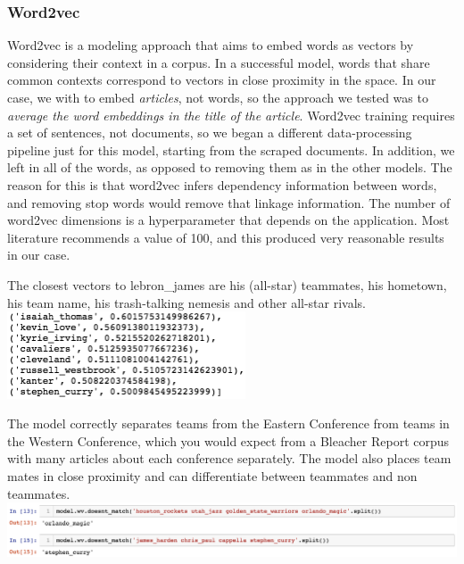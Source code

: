 \documentclass[11pt]{article}
\begin{document}
\subsubsection{Word2vec}
Word2vec is a modeling approach that aims to embed words as vectors by considering their context in a corpus.  In a successful model, words that share common contexts correspond to vectors in close proximity in the space.  In our case, we with to embed \textit{articles}, not words,  so the approach we tested was to \textit{average the word embeddings in the title of the article}. 
Word2vec training requires a set of sentences, not documents, so we began a different data-processing pipeline just for this model, starting from the scraped documents. In addition, we left in all of the words, as opposed to removing them as in the other models. The reason for this is that word2vec infers dependency information between words, and removing stop words would remove that linkage information.
The number of word2vec dimensions is a hyperparameter that depends on the application. Most literature recommends a value of 100, and this produced very reasonable results in our case.

The closest vectors to lebron\_james are his (all-star) teammates, his hometown, his team name, his trash-talking nemesis and other all-star rivals. \\
\includegraphics[width=200pt]{james_word2vec.png} 

The model correctly separates teams from the Eastern Conference from teams in the Western Conference, which you would expect from a Bleacher Report corpus with many articles about each conference separately. The model also places team mates in close proximity and can differentiate between teammates and non teammates. \\
\includegraphics[width=450pt]{word2vec_diffs.png} 
\end{document}
